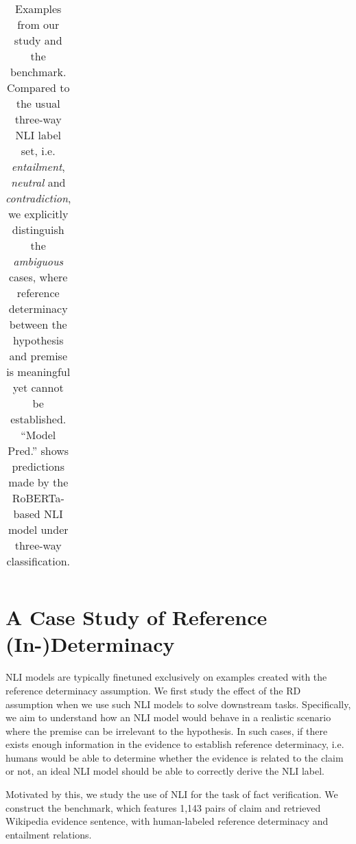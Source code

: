 \begin{table*}[t]
\begin{tabular}{p{0.2\linewidth}p{0.45\linewidth}cc}
\\ \bottomrule
\end{tabular}%
\caption{
Examples from our study and the \datasetname benchmark. Compared to the usual three-way NLI label set, i.e. \emph{entailment}, \emph{neutral} and \emph{contradiction}, we explicitly distinguish the \emph{ambiguous} cases, where reference determinacy between the hypothesis and premise is meaningful yet cannot be established. ``Model Pred.'' shows predictions made by the RoBERTa-based NLI model \citet{nie-etal-2020-adversarial} under three-way classification. 
}
\label{tab:refnli-examples}
\end{table*}

\section{A Case Study of Reference (In-)Determinacy}
\label{sec:benchmark}
NLI models are typically finetuned exclusively on examples created with the reference determinacy assumption. We first study the effect of the RD assumption when we use such NLI models to solve downstream tasks.
Specifically, we aim to understand how an NLI model would behave in a realistic scenario where the premise can be irrelevant to the hypothesis.
In such cases, if there exists enough information in the evidence to establish reference determinacy, i.e. humans would be able to determine whether the evidence is related to the claim or not, an ideal NLI model should be able to correctly derive the NLI label. 

Motivated by this, we study the use of NLI for the task of fact verification. 
We construct the \datasetname benchmark, which features 1,143 pairs of claim and retrieved Wikipedia evidence sentence, with human-labeled reference determinacy and entailment relations.
 


